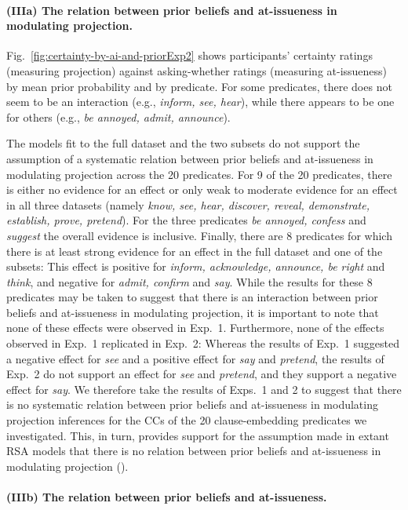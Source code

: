 \documentclass[11pt,fleqn]{article}
\newcommand{\6}{\mbox{$[\hspace*{-.6mm}[$}}
\newcommand{\9}{\mbox{$]\hspace*{-.6mm}]$}}
\begin{document}
\paragraph{(IIIa) The relation between prior beliefs and at-issueness in modulating projection.} Fig.~\ref{fig:certainty-by-ai-and-priorExp2} shows participants' certainty ratings (measuring projection) against asking-whether ratings (measuring at-issueness) by mean prior probability and by predicate. For some predicates, there does not seem to be an interaction (e.g., {\em inform, see, hear}), while there appears to be one for others  (e.g., {\em be annoyed, admit, announce}). 

The models fit to the full dataset and the two subsets do not support the assumption of a systematic relation between prior beliefs and at-issueness in modulating projection across the 20 predicates. For 9 of the 20 predicates, there is either no evidence for an effect or only weak to moderate evidence for an effect in all three datasets (namely {\em know, see, hear, discover, reveal, demonstrate, establish, prove, pretend}). For the three predicates {\em be annoyed, confess} and {\em suggest} the overall evidence is inclusive.  Finally, there are 8 predicates for which there is at least strong evidence for an effect in the full dataset and one of the subsets: This effect is positive for {\em inform, acknowledge, announce, be right} and {\em think}, and negative for {\em admit, confirm} and {\em say}. While the results for these 8 predicates may be taken to suggest that there is an interaction between prior beliefs and at-issueness in modulating projection, it is important to note that none of these effects were observed in Exp.~1. Furthermore, none of the effects observed in Exp.~1 replicated in Exp.~2: Whereas the results of Exp.~1 suggested a negative effect for {\em see} and a positive effect for {\em say} and {\em pretend}, the results of Exp.~2 do not support an effect for {\em see} and {\em pretend}, and they support a negative effect for {\em say}. We therefore take the results of Exps.~1 and 2 to suggest that there is no systematic relation between prior beliefs and at-issueness in modulating projection inferences for the CCs of the 20 clause-embedding predicates we investigated. This, in turn, provides support for the assumption made in extant RSA models that there is no relation between prior beliefs and at-issueness in modulating projection (\citealt{qing-etal2016,stevens-etal2017,warstadt2022,pan-degen2023}). 

\paragraph{(IIIb) The relation between prior beliefs and at-issueness.} 
\end{document}

